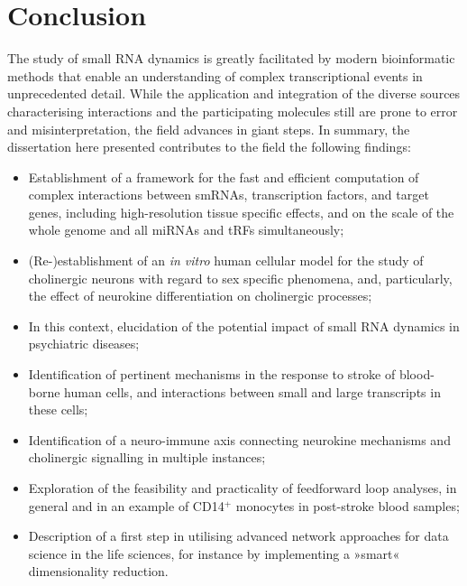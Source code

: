 %

\chapter{Conclusion}
\label{conclusion}
The study of small RNA dynamics is greatly facilitated by modern bioinformatic methods that enable an understanding of complex transcriptional events in unprecedented detail. While the application and integration of the diverse sources characterising interactions and the participating molecules still are prone to error and misinterpretation, the field advances in giant steps. In summary, the dissertation here presented contributes to the field the following findings:

\begin{itemize}[noitemsep, leftmargin=.5cm, label={\tiny\raisebox{.5ex}{\textbullet}}]
\item Establishment of a framework for the fast and efficient computation of complex interactions between smRNAs, transcription factors, and target genes, including high-resolution tissue specific effects, and on the scale of the whole genome and all miRNAs and tRFs simultaneously;

\item (Re-)establishment of an \emph{in vitro} human cellular model for the study of cholinergic neurons with regard to sex specific phenomena, and, particularly, the effect of neurokine differentiation on cholinergic processes;

\item In this context, elucidation of the potential impact of small RNA dynamics in psychiatric diseases;

\item Identification of pertinent mechanisms in the response to stroke of blood-borne human cells, and interactions between small and large transcripts in these cells;

\item Identification of a neuro-immune axis connecting neurokine mechanisms and cholinergic signalling in multiple instances;

\item Exploration of the feasibility and practicality of feedforward loop analyses, in general and in an example of CD14$^+$ monocytes in post-stroke blood samples;

\item Description of a first step in utilising advanced network approaches for data science in the life sciences, for instance by implementing a »smart« dimensionality reduction.
\end{itemize}

